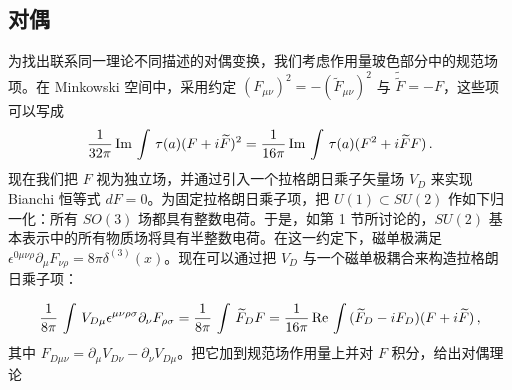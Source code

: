 
\subsection{对偶}

为找出联系同一理论不同描述的对偶变换，我们考虑作用量玻色部分中的规范场项。在 Minkowski 空间中，采用约定 $(F_{\mu\nu})^2=-(\widetilde F_{\mu \nu})^2$ 与 $\widetilde{\widetilde F}=-F$，这些项可以写成
$$
\frac{1}{32 \pi} \, {\rm Im}\, \int \, \tau (a) (F+i\widetilde F)^2 =
\frac{1}{16 \pi} \, {\rm Im} \, \int \, \tau (a) (F^{2}+i\widetilde
FF) \,.
$$
现在我们把 $F$ 视为独立场，并通过引入一个拉格朗日乘子矢量场 $V_{D}$ 来实现 Bianchi 恒等式 $dF = 0$。为固定拉格朗日乘子项，把 $U(1)\subset SU(2)$ 作如下归一化：所有 $SO(3)$ 场都具有整数电荷。于是，如第 1 节所讨论的，$SU(2)$ 基本表示中的所有物质场将具有半整数电荷。在这一约定下，磁单极满足 $\epsilon^{0\mu\nu\rho}\partial_{\mu}F_{\nu\rho}=8\pi\delta^{(3)}(x)$。现在可以通过把 $V_D$ 与一个磁单极耦合来构造拉格朗日乘子项：

$$
\frac{1}{8\pi}\,\int\,V_{D \mu}\epsilon^{\mu\nu\rho\sigma}
\partial_{\nu}F_{\rho\sigma}=\frac{1}{8\pi}\,\int\,\widetilde F_{D}F = 
\frac{1}{16\pi}\,{\rm Re}\,\int\,(\widetilde
F_{D}-iF_{D})(F+i\widetilde F)\,,
$$
其中 $F_{D\mu\nu}=\partial_\mu V_{D\nu}-\partial_\nu V_{D\mu}$。把它加到规范场作用量上并对 $F$ 积分，给出对偶理论

